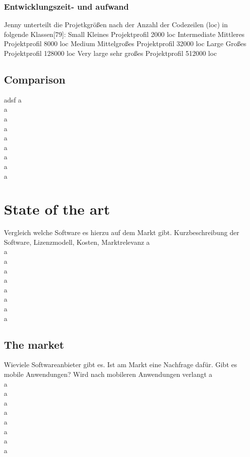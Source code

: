 \subsubsection{Entwicklungszeit- und aufwand}

Jenny unterteilt die Projetkgrößen nach der Anzahl der Codezeilen (loc) in folgende Klassen[79]:
Small	Kleines Projektprofil	2000 loc
Intermediate   	Mittleres Projektprofil	8000 loc
Medium	Mittelgroßes Projektprofil   	32000 loc
Large	Großes Projektprofil	128000 loc
Very large	sehr großes Projektprofil	512000 loc

\subsection{Comparison}

adsf
a\\
a\\
a\\
a\\
a\\
a\\
a\\
a\\
a

\section{State of the art}

Vergleich welche Software es hierzu auf dem Markt gibt. Kurzbeschreibung der Software, Lizenzmodell, Kosten, Marktrelevanz
a\\
a\\
a\\
a\\
a\\
a\\
a\\
a\\
a

\subsection{The market}

Wieviele Softwareanbieter gibt es. Ist am Markt eine Nachfrage dafür. Gibt es mobile Anwendungen? Wird nach mobileren Anwendungen verlangt
a\\
a\\
a\\
a\\
a\\
a\\
a\\
a\\
a
